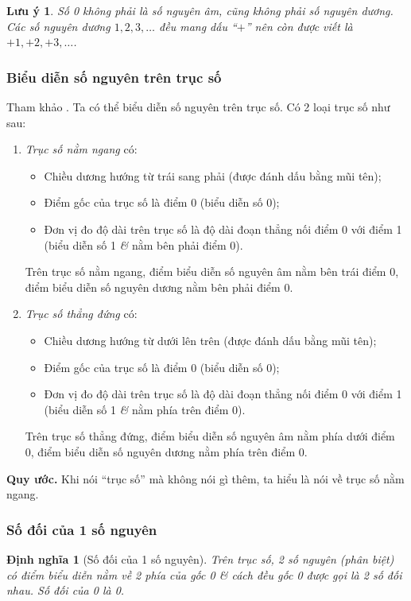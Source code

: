 \documentclass{article}
\numberwithin{equation}{section}
\newtheorem{dinhnghia}{Định nghĩa}[section]
\newtheorem{luuy}{Lưu ý}[section]
\begin{document}
\begin{luuy}
	Số 0 không phải là số nguyên âm, cũng không phải số nguyên dương. Các số nguyên dương $1,2,3,\ldots$ đều mang dấu ``$+$'' nên còn được viết là $+1,+2,+3,\ldots$.
\end{luuy}

\subsubsection{Biểu diễn số nguyên trên trục số}
Tham khảo \cite[pp. 65--66]{SGK_Toan_6_Canh_Dieu_tap_1}. Ta có thể biểu diễn số nguyên trên trục số. Có 2 loại trục số như sau:
\begin{enumerate}
	\item \textit{Trục số nằm ngang} có:
	\begin{itemize}
		\item Chiều dương hướng từ trái sang phải (được đánh dấu bằng mũi tên);
		\item Điểm gốc của trục số là điểm 0 (biểu diễn số 0);
		\item Đơn vị đo độ dài trên trục số là độ dài đoạn thẳng nối điểm 0 với điểm 1 (biểu diễn số 1 \textit{\&} nằm bên phải điểm 0).
	\end{itemize}
	Trên trục số nằm ngang, điểm biểu diễn số nguyên âm nằm bên trái điểm 0, điểm biểu diễn số nguyên dương nằm bên phải điểm 0.
	\item \textit{Trục số thẳng đứng} có:
	\begin{itemize}
		\item Chiều dương hướng từ dưới lên trên (được đánh dấu bằng mũi tên);
		\item Điểm gốc của trục số là điểm 0 (biểu diễn số 0);
		\item Đơn vị đo độ dài trên trục số là độ dài đoạn thẳng nối điểm 0 với điểm 1 (biểu diễn số 1 \textit{\&} nằm phía trên điểm 0).
	\end{itemize}
	Trên trục số thẳng đứng, điểm biểu diễn số nguyên âm nằm phía dưới điểm 0, điểm biểu diễn số nguyên dương nằm phía trên điểm 0.
\end{enumerate}
\noindent\textbf{Quy ước.} Khi nói ``trục số'' mà không nói gì thêm, ta hiểu là nói về trục số nằm ngang.

\subsubsection{Số đối của 1 số nguyên}

\begin{dinhnghia}[Số đối của 1 số nguyên]
	Trên trục số, 2 số nguyên (phân biệt) có điểm biểu diễn nằm về 2 phía của gốc 0 \textit{\&} cách đều gốc 0 được gọi là \emph{2 số đối nhau}. Số đối của 0 là 0.
\end{dinhnghia}
\end{document}

